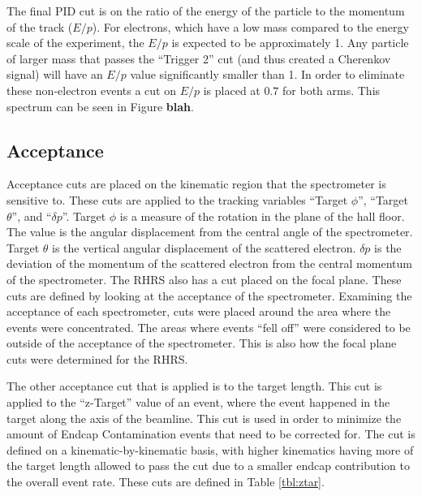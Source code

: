 The final PID cut is on the ratio of the energy of the particle to the momentum of the track ($E/p$). For electrons, which have a low mass compared to the energy scale of the experiment, the $E/p$ is expected to be approximately 1. Any particle of larger mass that passes the ``Trigger 2'' cut (and thus created a Cherenkov signal) will have an $E/p$ value significantly smaller than 1. In order to eliminate these non-electron events a cut on $E/p$ is placed at $0.7$ for both arms. This spectrum can be seen in Figure \textbf{blah}.

\subsection{Acceptance}

Acceptance cuts are placed on the kinematic region that the spectrometer is sensitive to. These cuts are applied to the tracking variables ``Target $\phi$'', ``Target $\theta$'', and ``$\delta p$''. Target $\phi$ is a measure of the rotation in the plane of the hall floor. The value is the angular displacement from the central angle of the spectrometer. Target $\theta$ is the vertical angular displacement of the scattered electron. $\delta p$ is the deviation of the momentum of the scattered electron from the central momentum of the spectrometer. The RHRS also has a cut placed on the focal plane. These cuts are defined by looking at the acceptance of the spectrometer. Examining the acceptance of each spectrometer, cuts were placed around the area where the events were concentrated. The areas where events ``fell off'' were considered to be outside of the acceptance of the spectrometer. This is also how the focal plane cuts were determined for the RHRS.

The other acceptance cut that is applied is to the target length. This cut is applied to the ``z-Target'' value of an event, where the event happened in the target along the axis of the beamline. This cut is used in order to minimize the amount of Endcap Contamination events that need to be corrected for. The cut is defined on a kinematic-by-kinematic basis, with higher kinematics having more of the target length allowed to pass the cut due to a smaller endcap contribution to the overall event rate. These cuts are defined in Table \ref{tbl:ztar}.

